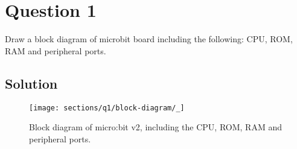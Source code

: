 \section*{Question 1}

Draw a block diagram of microbit board including the following: CPU, ROM, RAM and peripheral ports.

\subsection*{Solution}

\begin{figure*}[htbp]
    \centering
    \texttt{[image: sections/q1/block-diagram/\_]}
    \caption[Block diagram of micro:bit v2]{
        Block diagram of micro:bit v2, including the CPU, ROM, RAM and peripheral ports.
    }\label{fig:block-diagram-microbit}
\end{figure*}
